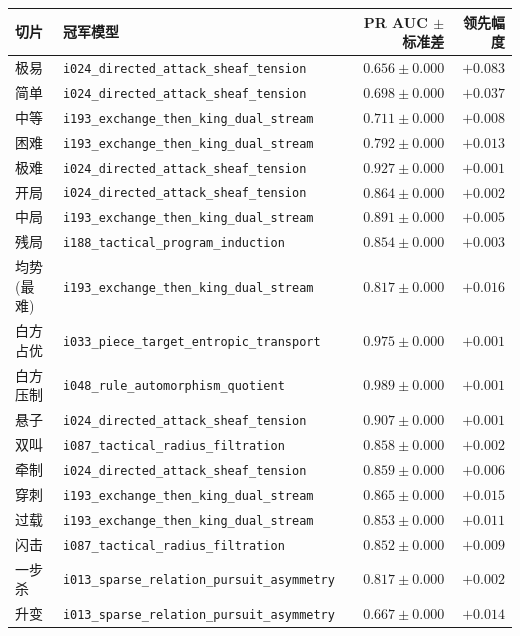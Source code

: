 \documentclass[10pt,a4paper]{article}
\begin{document}
\begin{small}
\begin{tabularx}{\linewidth}{@{}p{3.0cm} L r r@{}}
\toprule
\textbf{切片} & \textbf{冠军模型} & \textbf{PR AUC} $\pm$ \textbf{标准差} & \textbf{领先幅度} \\
\midrule
极易 & \texttt{i024\_directed\_attack\_sheaf\_tension} & $\mathbf{0.656} \pm 0.000$ & $+0.083$ \\
简单 & \texttt{i024\_directed\_attack\_sheaf\_tension} & $\mathbf{0.698} \pm 0.000$ & $+0.037$ \\
中等 & \texttt{i193\_exchange\_then\_king\_dual\_stream} & $\mathbf{0.711} \pm 0.000$ & $+0.008$ \\
困难 & \texttt{i193\_exchange\_then\_king\_dual\_stream} & $\mathbf{0.792} \pm 0.000$ & $+0.013$ \\
极难 & \texttt{i024\_directed\_attack\_sheaf\_tension} & $\mathbf{0.927} \pm 0.000$ & $+0.001$ \\
开局 & \texttt{i024\_directed\_attack\_sheaf\_tension} & $\mathbf{0.864} \pm 0.000$ & $+0.002$ \\
中局 & \texttt{i193\_exchange\_then\_king\_dual\_stream} & $\mathbf{0.891} \pm 0.000$ & $+0.005$ \\
残局 & \texttt{i188\_tactical\_program\_induction} & $\mathbf{0.854} \pm 0.000$ & $+0.003$ \\
均势(最难) & \texttt{i193\_exchange\_then\_king\_dual\_stream} & $\mathbf{0.817} \pm 0.000$ & $+0.016$ \\
白方占优 & \texttt{i033\_piece\_target\_entropic\_transport} & $\mathbf{0.975} \pm 0.000$ & $+0.001$ \\
白方压制 & \texttt{i048\_rule\_automorphism\_quotient} & $\mathbf{0.989} \pm 0.000$ & $+0.001$ \\
悬子 & \texttt{i024\_directed\_attack\_sheaf\_tension} & $\mathbf{0.907} \pm 0.000$ & $+0.001$ \\
双叫 & \texttt{i087\_tactical\_radius\_filtration} & $\mathbf{0.858} \pm 0.000$ & $+0.002$ \\
牵制 & \texttt{i024\_directed\_attack\_sheaf\_tension} & $\mathbf{0.859} \pm 0.000$ & $+0.006$ \\
穿刺 & \texttt{i193\_exchange\_then\_king\_dual\_stream} & $\mathbf{0.865} \pm 0.000$ & $+0.015$ \\
过载 & \texttt{i193\_exchange\_then\_king\_dual\_stream} & $\mathbf{0.853} \pm 0.000$ & $+0.011$ \\
闪击 & \texttt{i087\_tactical\_radius\_filtration} & $\mathbf{0.852} \pm 0.000$ & $+0.009$ \\
一步杀 & \texttt{i013\_sparse\_relation\_pursuit\_asymmetry} & $\mathbf{0.817} \pm 0.000$ & $+0.002$ \\
升变 & \texttt{i013\_sparse\_relation\_pursuit\_asymmetry} & $\mathbf{0.667} \pm 0.000$ & $+0.014$ \\
\bottomrule
\end{tabularx}
\end{small}
\end{document}

